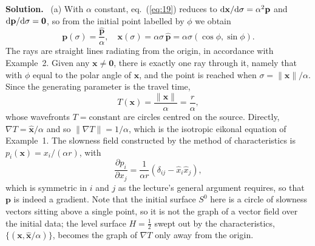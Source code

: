 \documentclass[a4paper,12pt]{paper}
\newenvironment{solution}{\par\noindent\textbf{Solution.}\ }{\par\medskip}
\begin{document}
\begin{solution}
(a) With $\alpha$ constant, eq.~(\ref{eq:19}) reduces to
$\mathrm{d}\mathbf{x}/\mathrm{d}\sigma=\alpha^{2}\mathbf{p}$ and $\mathrm{d}\mathbf{p}/\mathrm{d}\sigma=\mathbf{0}$, so from
the initial point labelled by $\phi$ we obtain
\begin{equation}
\mathbf{p}(\sigma)=\frac{\hat{\mathbf{p}}}{\alpha},\quad
\mathbf{x}(\sigma)=\alpha\sigma\,\hat{\mathbf{p}}=\alpha\sigma(\cos\phi,\sin\phi).
\label{eq:42}
\end{equation}
The rays are straight lines radiating from the origin, in accordance with Example~2. Given any
$\mathbf{x}\ne\mathbf{0}$, there is exactly one ray through it, namely that with $\phi$ equal to the
polar angle of $\mathbf{x}$, and the point is reached when $\sigma=\|\mathbf{x}\|/\alpha$. Since the
generating parameter is the travel time,
\begin{equation}
T(\mathbf{x})=\frac{\|\mathbf{x}\|}{\alpha}=\frac{r}{\alpha},
\label{eq:43}
\end{equation}
whose wavefronts $T=\text{constant}$ are circles centred on the source. Directly,
$\nabla T=\hat{\mathbf{x}}/\alpha$ and so $\|\nabla T\|=1/\alpha$, which is the isotropic eikonal
equation of Example~1. The slowness field constructed by the method of characteristics is
$p_{i}(\mathbf{x})=x_{i}/(\alpha r)$, with
\begin{equation}
\frac{\partial p_{i}}{\partial x_{j}}=\frac{1}{\alpha r}\left(\delta_{ij}-\hat{x}_{i}\hat{x}_{j}\right),
\label{eq:44}
\end{equation}
which is symmetric in $i$ and $j$ as the lecture's general argument requires, so that $\mathbf{p}$ is
indeed a gradient. Note that the initial surface $S^{0}$ here is a circle of slowness vectors sitting
above a single point, so it is not the graph of a vector field over the initial data; the level
surface $H=\frac{1}{2}$ swept out by the characteristics, $\{(\mathbf{x},\hat{\mathbf{x}}/\alpha)\}$,
becomes the graph of $\nabla T$ only away from the origin.


\end{solution}
\end{document}
